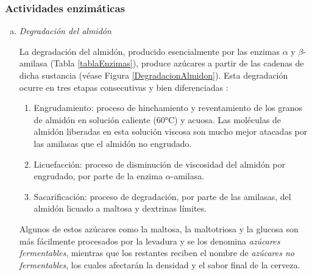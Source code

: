             \subsubsection{Actividades enzimáticas}
                \begin{enumerate}[a)]
                    \item \textit{Degradación del almidón}
                        \par La degradación del almidón, producido esencialmente por las enzimas $\alpha$ y $\beta$-amilasa (Tabla \ref{tablaEnzimas}), produce azúcares a partir de las cadenas de dicha sustancia (véase Figura \ref{DegradacionAlmidon}). Esta degradación ocurre en tres etapas consecutivas y bien diferenciadas \cite{Kunze}:
                        
                        \begin{enumerate}[1.]
                            \item Engrudamiento: proceso de hinchamiento y reventamiento de los granos de almidón en solución caliente (60°C) y acuosa. Las moléculas de almidón liberadas en esta solución viscosa son mucho mejor atacadas por las amilasas que el almidón no engrudado.
                            
                            \item Licuefacción: proceso de disminución de viscosidad del almidón por engrudado, por parte de la enzima $\alpha$-amilasa.
                            
                            \item Sacarificación: proceso de degradación, por parte de las amilasas, del almidón licuado a maltosa y dextrinas límites.
                        \end{enumerate}
                        
                        \par Algunos de estos azúcares como la maltosa, la maltotriosa y la glucosa son más fácilmente procesados por la levadura y se los denomina \textit{azúcares fermentables}, mientras que los restantes reciben el nombre de \textit{azúcares no fermentables}, los cuales afectarán la densidad y el sabor final de la cerveza.
                        

\end{enumerate}
